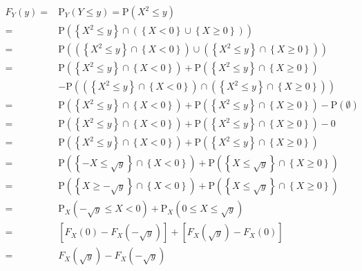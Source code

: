 \documentclass[
]{book}
\theoremstyle{definition}
\theoremstyle{definition}
\theoremstyle{definition}
\theoremstyle{definition}
\theoremstyle{remark}
\begin{document}
\[
\begin{aligned}
F_{{\scriptscriptstyle Y}}\left(y\right)= & \mathrm{P}_{{\scriptscriptstyle Y}}\left(Y\le y\right)=\mathrm{P}\left(X^{2}\le y\right)\\
= & \mathrm{P}\left(\left\{ X^{2}\le y\right\} \cap\left(\left\{ X<0\right\} \cup\left\{ X\ge0\right\} \right)\right)\\
= & \mathrm{P}\left(\left(\left\{ X^{2}\le y\right\} \cap\left\{ X<0\right\} \right)\cup\left(\left\{ X^{2}\le y\right\} \cap\left\{ X\ge0\right\} \right)\right)\\
= & \mathrm{P}\left(\left\{ X^{2}\le y\right\} \cap\left\{ X<0\right\} \right)+\mathrm{P}\left(\left\{ X^{2}\le y\right\} \cap\left\{ X\ge0\right\} \right)\\
 & -\mathrm{P}\left(\left(\left\{ X^{2}\le y\right\} \cap\left\{ X<0\right\} \right)\cap\left(\left\{ X^{2}\le y\right\} \cap\left\{ X\ge0\right\} \right)\right)\\
= & \mathrm{P}\left(\left\{ X^{2}\le y\right\} \cap\left\{ X<0\right\} \right)+\mathrm{P}\left(\left\{ X^{2}\le y\right\} \cap\left\{ X\ge0\right\} \right)-\mathrm{P}\left(\emptyset\right)\\
= & \mathrm{P}\left(\left\{ X^{2}\le y\right\} \cap\left\{ X<0\right\} \right)+\mathrm{P}\left(\left\{ X^{2}\le y\right\} \cap\left\{ X\ge0\right\} \right)-0\\
= & \mathrm{P}\left(\left\{ X^{2}\le y\right\} \cap\left\{ X<0\right\} \right)+\mathrm{P}\left(\left\{ X^{2}\le y\right\} \cap\left\{ X\ge0\right\} \right)\\
= & \mathrm{P}\left(\left\{ -X\le\sqrt{y}\right\} \cap\left\{ X<0\right\} \right)+\mathrm{P}\left(\left\{ X\le\sqrt{y}\right\} \cap\left\{ X\ge0\right\} \right)\\
= & \mathrm{P}\left(\left\{ X\ge-\sqrt{y}\right\} \cap\left\{ X<0\right\} \right)+\mathrm{P}\left(\left\{ X\le\sqrt{y}\right\} \cap\left\{ X\ge0\right\} \right)\\
= & \mathrm{P}_{{\scriptscriptstyle X}}\left(-\sqrt{y}\le X<0\right)+\mathrm{P}_{{\scriptscriptstyle X}}\left(0\le X\le\sqrt{y}\right)\\
= & \left[F_{{\scriptscriptstyle X}}\left(0\right)-F_{{\scriptscriptstyle X}}\left(-\sqrt{y}\right)\right]+\left[F_{{\scriptscriptstyle X}}\left(\sqrt{y}\right)-F_{{\scriptscriptstyle X}}\left(0\right)\right]\\
= & F_{{\scriptscriptstyle X}}\left(\sqrt{y}\right)-F_{{\scriptscriptstyle X}}\left(-\sqrt{y}\right)
\end{aligned}
\]
\end{document}
